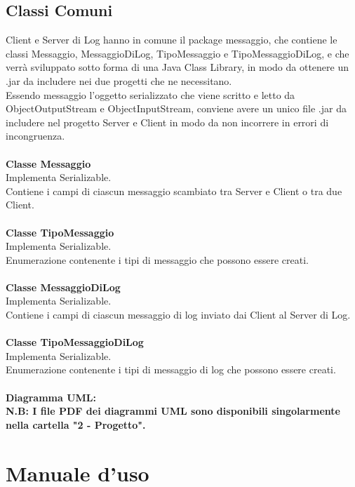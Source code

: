 \documentclass[a4paper, 11pt]{article} %
\begin{document}
\subsection{Classi Comuni}

Client e Server di Log hanno in comune il package messaggio, che contiene le classi Messaggio, MessaggioDiLog, TipoMessaggio e TipoMessaggioDiLog, e che verr\`a sviluppato sotto forma di una Java Class Library, in modo da ottenere un .jar da includere nei due progetti che ne necessitano.\\
Essendo messaggio l'oggetto serializzato che viene scritto e letto da ObjectOutputStream e ObjectInputStream, conviene avere un unico file .jar da includere nel progetto Server e Client in modo da non incorrere in errori di incongruenza.\\
\\
\textbf{Classe Messaggio}\\
Implementa Serializable.\\
Contiene i campi di ciascun messaggio scambiato tra Server e Client o tra due Client.\\
\\
\textbf{Classe TipoMessaggio}\\
Implementa Serializable.\\
Enumerazione contenente i tipi di messaggio che possono essere creati.\\
\\
\textbf{Classe MessaggioDiLog}\\
Implementa Serializable.\\
Contiene i campi di ciascun messaggio di log inviato dai Client al Server di Log.\\
\\
\textbf{Classe TipoMessaggioDiLog}\\
Implementa Serializable.\\
Enumerazione contenente i tipi di messaggio di log che possono essere creati.\\
\\
\textbf{Diagramma UML:}\\
\textbf{N.B: I file PDF dei diagrammi UML sono disponibili singolarmente nella cartella "2 - Progetto".}
\clearpage


\newpage
\section{Manuale d'uso}
\end{document}
